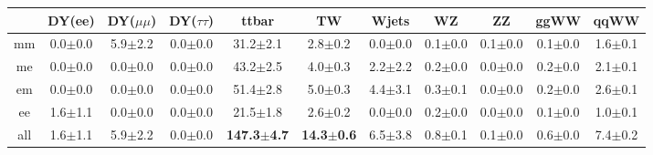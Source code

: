\begin{table}[!ht]
  \begin{center}
 {\small
  \begin{tabular} {|c|c|c|c|c|c|c|c|c|c|c|}
\hline
  & DY(ee) & DY($\mu\mu$) & DY($\tau\tau$) & ttbar & TW & Wjets & WZ & ZZ & ggWW & qqWW \\
  \hline
  \hline
  mm &  0.0$\pm$0.0 &  5.9$\pm$2.2 &  0.0$\pm$0.0 & 31.2$\pm$2.1 &  2.8$\pm$0.2 &  0.0$\pm$0.0 &  0.1$\pm$0.0 &  0.1$\pm$0.0 &  0.1$\pm$0.0 &  1.6$\pm$0.1 \\
  me &  0.0$\pm$0.0 &  0.0$\pm$0.0 &  0.0$\pm$0.0 & 43.2$\pm$2.5 &  4.0$\pm$0.3 &  2.2$\pm$2.2 &  0.2$\pm$0.0 &  0.0$\pm$0.0 &  0.2$\pm$0.0 &  2.1$\pm$0.1 \\
  em &  0.0$\pm$0.0 &  0.0$\pm$0.0 &  0.0$\pm$0.0 & 51.4$\pm$2.8 &  5.0$\pm$0.3 &  4.4$\pm$3.1 &  0.3$\pm$0.1 &  0.0$\pm$0.0 &  0.2$\pm$0.0 &  2.6$\pm$0.1 \\
  ee &  1.6$\pm$1.1 &  0.0$\pm$0.0 &  0.0$\pm$0.0 & 21.5$\pm$1.8 &  2.6$\pm$0.2 &  0.0$\pm$0.0 &  0.2$\pm$0.0 &  0.0$\pm$0.0 &  0.1$\pm$0.0 &  1.0$\pm$0.1 \\
 \hline
 all &  1.6$\pm$1.1 &  5.9$\pm$2.2 &  0.0$\pm$0.0 & {\bf147.3$\pm$4.7} & {\bf14.3$\pm$0.6} &  6.5$\pm$3.8 &  0.8$\pm$0.1 &  0.1$\pm$0.0 &  0.6$\pm$0.0 &  7.4$\pm$0.2 \\


\end{tabular}}
\end{center}
\end{table}
